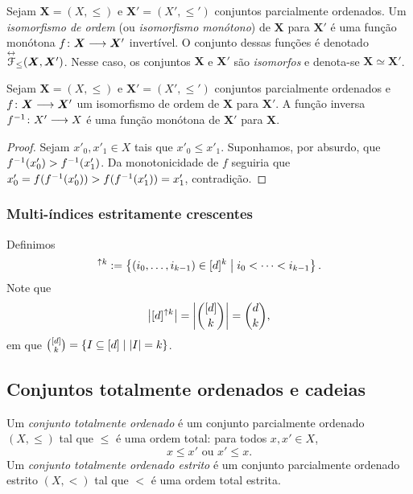 \begin{definition}
	Sejam $\bm X = (X,\leq)$ e $\bm X' = (X',\leq')$ conjuntos parcialmente ordenados. Um \emph{isomorfismo de ordem} (ou \emph{isomorfismo monótono}) de $\bm X$ para $\bm X'$ é uma função monótona ${f}\colon {\bm X} \longrightarrow {\bm X'}$ invertível. O conjunto dessas funções é denotado $\overset{\leftrightarrow}{\mathcal{F}}_\leq(\bm X, \bm X')$. Nesse caso, os conjuntos $\bm X$ e $\bm X'$ são \emph{isomorfos} e denota-se $\bm X \simeq \bm X'$.
\end{definition}

\begin{proposition}
	Sejam $\bm X = (X,\leq)$ e $\bm X' = (X',\leq')$ conjuntos parcialmente ordenados e ${f}\colon {\bm X} \longrightarrow {\bm X'}$ um isomorfismo de ordem de $\bm X$ para $\bm X'$. A função inversa ${f^{-1}}\colon {X'} \longrightarrow {X}$ é uma função monótona de $\bm X'$ para $\bm X$.
\end{proposition}
\begin{proof}
	Sejam $x'_0,x'_1 \in X$ tais que $x'_0 \leq x'_1$. Suponhamos, por absurdo, que $f^{-1}(x'_0) > f^{-1}(x'_1)$. Da monotonicidade de $f$ seguiria que $x'_0 = f(f^{-1}(x'_0)) > f(f^{-1}(x'_1)) = x'_1$, contradição.
\end{proof}

\subsubsection{Multi-índices estritamente crescentes}

Definimos
	\begin{equation*}
	[d]^{\uparrow k} := \set{(i_0,\ldots,i_{k-1}) \in [d]^k}{i_{0}<\cdots<i_{k-1}}.
	\end{equation*}
Note que
	\begin{equation*}
	\left\lvert{[d]^{\uparrow k}}\right\rvert = \left\lvert{\binom{[d]}{k}}\right\rvert = \binom{d}{k},
	\end{equation*}
em que $\binom{[d]}{k} = \left\{{I \subseteq [d]}\;\middle\vert\;{\left\lvert{I}\right\rvert=k}\right\}$.



\subsection{Conjuntos totalmente ordenados e cadeias}

\begin{definition}
	Um \emph{conjunto totalmente ordenado} é um conjunto parcialmente ordenado $(X,\leq)$ tal que $\leq$ é uma ordem total: para todos $x,x' \in X$,
		\begin{equation*}
			x \leq x' \text{\ \ ou\ \ } x' \leq x.
		\end{equation*}
	Um \emph{conjunto totalmente ordenado estrito} é um conjunto parcialmente ordenado estrito $(X,<)$ tal que $<$ é uma ordem total estrita.
\end{definition}

